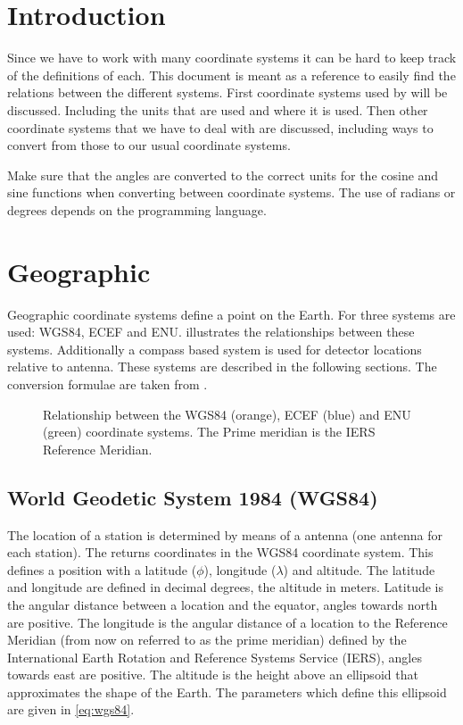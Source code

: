 \section{Introduction}

Since we have to work with many coordinate systems it can be hard to
keep track of the definitions of each. This document is meant as a
reference to easily find the relations between the different systems.
First coordinate systems used by \hisparc will be discussed. Including
the units that are used and where it is used. Then other coordinate
systems that we have to deal with are discussed, including ways to
convert from those to our usual coordinate systems.

Make sure that the angles are converted to the correct units for the
cosine and sine functions when converting between coordinate systems.
The use of radians or degrees depends on the programming language.


\section{Geographic}

Geographic coordinate systems define a point on the Earth. For \hisparc
three systems are used: WGS84, ECEF and ENU. 
illustrates the relationships between these systems. Additionally a
compass based system is used for detector locations relative to \gps
antenna. These systems are described in the following sections. The
conversion formulae are taken from \cite{wikipedia:2014aa}.

\begin{figure}
    \centering
    
    \caption{Relationship between the WGS84 (orange), ECEF (blue) and ENU
             (green) coordinate systems. The Prime meridian is the IERS
             Reference Meridian.}
    \label{fig:wgs84_ecef_enu}
\end{figure}


\subsection{World Geodetic System 1984 (WGS84)}

The location of a \hisparc station is determined by means of a \gps
antenna (one antenna for each station). The \gps returns coordinates in
the WGS84 coordinate system. This defines a position with a latitude
($\phi$), longitude ($\lambda$) and altitude. The latitude and longitude
are defined in decimal degrees, the altitude in meters. Latitude is the
angular distance between a location and the equator, angles towards
north are positive. The longitude is the angular distance of a location
to the Reference Meridian (from now on referred to as the prime
meridian) defined by the International Earth Rotation and Reference
Systems Service (IERS), angles towards east are positive. The altitude
is the height above an ellipsoid that approximates the shape of the
Earth. The parameters which define this ellipsoid are given in
\eqref{eq:wgs84}.


